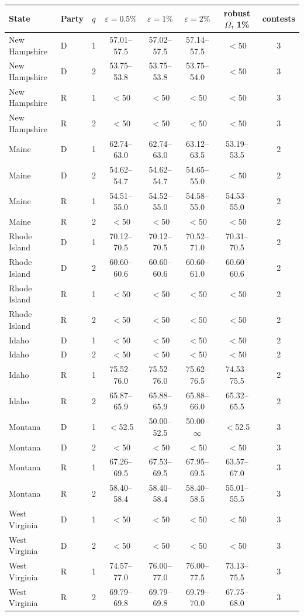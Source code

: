\begin{tabular}{llcccccc}
\toprule
State & Party & $q$ & $\varepsilon{=}0.5\%$ & $\varepsilon{=}1\%$ & $\varepsilon{=}2\%$ & robust $\Omega$, 1\% & contests \\
\midrule
New Hampshire & D & 1 & 57.01--57.5 & 57.02--57.5 & 57.14--57.5 & $<$50 & 3 \\
New Hampshire & D & 2 & 53.75--53.8 & 53.75--53.8 & 53.75--54.0 & $<$50 & 3 \\
New Hampshire & R & 1 & $<$50 & $<$50 & $<$50 & $<$50 & 3 \\
New Hampshire & R & 2 & $<$50 & $<$50 & $<$50 & $<$50 & 3 \\
Maine & D & 1 & 62.74--63.0 & 62.74--63.0 & 63.12--63.5 & 53.19--53.5 & 2 \\
Maine & D & 2 & 54.62--54.7 & 54.62--54.7 & 54.65--55.0 & $<$50 & 2 \\
Maine & R & 1 & 54.51--55.0 & 54.52--55.0 & 54.58--55.0 & 54.53--55.0 & 2 \\
Maine & R & 2 & $<$50 & $<$50 & $<$50 & $<$50 & 2 \\
Rhode Island & D & 1 & 70.12--70.5 & 70.12--70.5 & 70.52--71.0 & 70.31--70.5 & 2 \\
Rhode Island & D & 2 & 60.60--60.6 & 60.60--60.6 & 60.60--61.0 & 60.60--60.6 & 2 \\
Rhode Island & R & 1 & $<$50 & $<$50 & $<$50 & $<$50 & 2 \\
Rhode Island & R & 2 & $<$50 & $<$50 & $<$50 & $<$50 & 2 \\
Idaho & D & 1 & $<$50 & $<$50 & $<$50 & $<$50 & 2 \\
Idaho & D & 2 & $<$50 & $<$50 & $<$50 & $<$50 & 2 \\
Idaho & R & 1 & 75.52--76.0 & 75.52--76.0 & 75.62--76.5 & 74.53--75.5 & 2 \\
Idaho & R & 2 & 65.87--65.9 & 65.88--65.9 & 65.88--66.0 & 65.32--65.5 & 2 \\
Montana & D & 1 & $<$52.5 & 50.00--52.5 & 50.00--$\infty$ & $<$52.5 & 3 \\
Montana & D & 2 & $<$50 & $<$50 & $<$50 & $<$50 & 3 \\
Montana & R & 1 & 67.26--69.5 & 67.53--69.5 & 67.95--69.5 & 63.57--67.0 & 3 \\
Montana & R & 2 & 58.40--58.4 & 58.40--58.4 & 58.40--58.5 & 55.01--55.5 & 3 \\
West Virginia & D & 1 & $<$50 & $<$50 & $<$50 & $<$50 & 3 \\
West Virginia & D & 2 & $<$50 & $<$50 & $<$50 & $<$50 & 3 \\
West Virginia & R & 1 & 74.57--77.0 & 76.00--77.0 & 76.00--77.5 & 73.13--75.5 & 3 \\
West Virginia & R & 2 & 69.79--69.8 & 69.79--69.8 & 69.79--70.0 & 67.75--68.0 & 3 \\
\bottomrule
\end{tabular}
